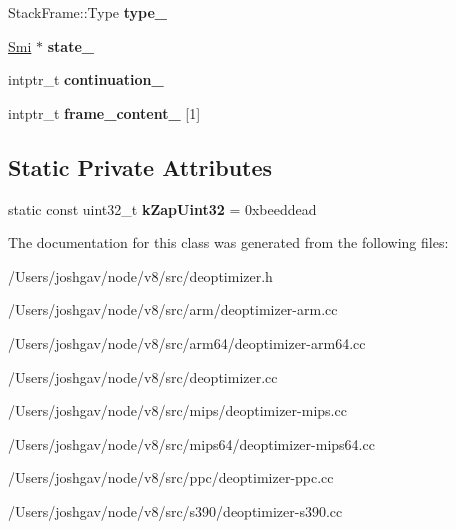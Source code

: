 \begin{DoxyCompactItemize}
\item 
Stack\+Frame\+::\+Type {\bfseries type\+\_\+}\hypertarget{classv8_1_1internal_1_1_frame_description_a2aa02187984968ae502ab2b3b281300d}{}\label{classv8_1_1internal_1_1_frame_description_a2aa02187984968ae502ab2b3b281300d}

\item 
\hyperlink{classv8_1_1internal_1_1_smi}{Smi} $\ast$ {\bfseries state\+\_\+}\hypertarget{classv8_1_1internal_1_1_frame_description_a521499a4ae9f5077f27aab1afc78af92}{}\label{classv8_1_1internal_1_1_frame_description_a521499a4ae9f5077f27aab1afc78af92}

\item 
intptr\+\_\+t {\bfseries continuation\+\_\+}\hypertarget{classv8_1_1internal_1_1_frame_description_a6f5c674289ac5ff7a9771d5f4c5b9996}{}\label{classv8_1_1internal_1_1_frame_description_a6f5c674289ac5ff7a9771d5f4c5b9996}

\item 
intptr\+\_\+t {\bfseries frame\+\_\+content\+\_\+} \mbox{[}1\mbox{]}\hypertarget{classv8_1_1internal_1_1_frame_description_accc03e570e2623f6c283f5f3f8f40a11}{}\label{classv8_1_1internal_1_1_frame_description_accc03e570e2623f6c283f5f3f8f40a11}

\end{DoxyCompactItemize}
\subsection*{Static Private Attributes}
\begin{DoxyCompactItemize}
\item 
static const uint32\+\_\+t {\bfseries k\+Zap\+Uint32} = 0xbeeddead\hypertarget{classv8_1_1internal_1_1_frame_description_a7d055422def1db2c07c697d8503aa65c}{}\label{classv8_1_1internal_1_1_frame_description_a7d055422def1db2c07c697d8503aa65c}

\end{DoxyCompactItemize}


The documentation for this class was generated from the following files\+:\begin{DoxyCompactItemize}
\item 
/\+Users/joshgav/node/v8/src/deoptimizer.\+h\item 
/\+Users/joshgav/node/v8/src/arm/deoptimizer-\/arm.\+cc\item 
/\+Users/joshgav/node/v8/src/arm64/deoptimizer-\/arm64.\+cc\item 
/\+Users/joshgav/node/v8/src/deoptimizer.\+cc\item 
/\+Users/joshgav/node/v8/src/mips/deoptimizer-\/mips.\+cc\item 
/\+Users/joshgav/node/v8/src/mips64/deoptimizer-\/mips64.\+cc\item 
/\+Users/joshgav/node/v8/src/ppc/deoptimizer-\/ppc.\+cc\item 
/\+Users/joshgav/node/v8/src/s390/deoptimizer-\/s390.\+cc\end{DoxyCompactItemize}
